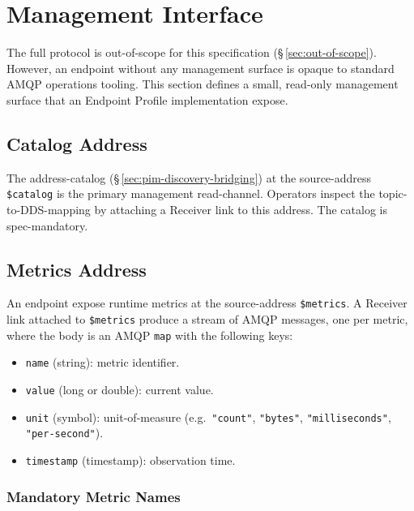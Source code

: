 \documentclass{../styles/zerodds-vendor-spec}
\begin{document}
\section{Management Interface}\label{sec:management-interface}

The full  protocol is out-of-scope
for this specification (\S\,\ref{sec:out-of-scope}). However, an
endpoint without any management surface is opaque to standard
AMQP operations tooling. This section defines a small,
read-only management surface that an Endpoint Profile
implementation  expose.

\subsection{Catalog Address}

The address-catalog (\S\,\ref{sec:pim-discovery-bridging}) at
the source-address \texttt{\$catalog} is the primary management
read-channel. Operators inspect the topic-to-DDS-mapping by
attaching a Receiver link to this address. The catalog is
spec-mandatory.

\subsection{Metrics Address}\label{sec:management-metrics}

An endpoint  expose runtime metrics at the
source-address \texttt{\$metrics}. A Receiver link attached to
\texttt{\$metrics}  produce a stream of AMQP
messages, one per metric, where the body is an AMQP
\texttt{map} with the following keys:

\begin{itemize}
  \item \texttt{name} (string): metric identifier.
  \item \texttt{value} (long or double): current value.
  \item \texttt{unit} (symbol): unit-of-measure
        (e.g.\ \texttt{"count"}, \texttt{"bytes"},
        \texttt{"milliseconds"}, \texttt{"per-second"}).
  \item \texttt{timestamp} (timestamp): observation time.
\end{itemize}

\subsubsection{Mandatory Metric Names}
\end{document}
